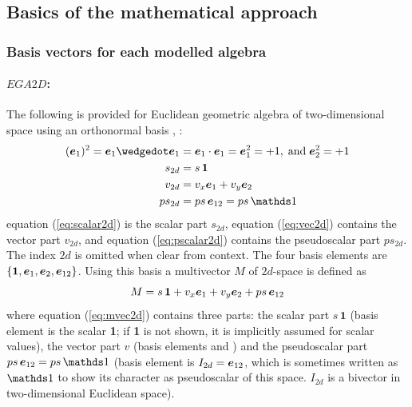 \subsection{Basics of the mathematical approach}
\label{subsection:basics}

\subsubsection{Basis vectors for each modelled algebra}
\label{subsection:basis_vectors_each_algebra}

\paragraph{$EGA2D$:}
The following is provided for Euclidean geometric algebra of two-dimensional space using
an orthonormal basis , :
\begin{subequations}
    \begin{align}
        (\bv{1})^2 = \bv{1} \wedgedot \bv1 & = \bv{1} \cdot \bv1 = \bv{1}^2 = +1,
        \;\text{and}\; \bv{2}^2 = +1 \nonumber\\
        s_{2d} & = s \, \bm{1}
        \label{eq:scalar2d} \\
        v_{2d} & = v_x\bv{1} + v_y\bv{2} 
        \label{eq:vec2d} \\
        ps_{2d} & = ps \, \bv{12}  = ps \, \ps
        \label{eq:pscalar2d}
    \end{align}
\end{subequations}
equation (\ref{eq:scalar2d}) is the scalar part $s_{2d}$, equation (\ref{eq:vec2d})
contains the vector part $v_{2d}$, and equation (\ref{eq:pscalar2d}) contains the
pseudoscalar part $ps_{2d}$. The index $2d$ is omitted when clear from context.
The four basis elements are $\{\bm{1}, \bm{e}_{1}, \bm{e}_{2}, \bm{e}_{12}\}$. Using this basis a
multivector $M$ of $2d$-space is defined as
\begin{equation}
     M = s \, \bm{1} + v_x\bm{e}_{1} + v_y\bm{e}_{2} + ps \, \bm{e}_{12}
    \label{eq:mvec2d}   
\end{equation}
where equation (\ref{eq:mvec2d}) contains three parts: the scalar part $s \, \bm{1}$
(basis element is the scalar \textbf{1}; if \textbf{1} is not shown, it is implicitly
assumed for scalar values), the vector part $v$ (basis elements  and ) and the
pseudoscalar part $ps \, \bv{12} = ps \, \ps$ (basis element is $I_{2d} =
\bm{e}_{12}$, which is sometimes written as $\ps$ to show its character as
pseudoscalar of this space. $I_{2d}$ is a bivector in two-dimensional Euclidean space).

